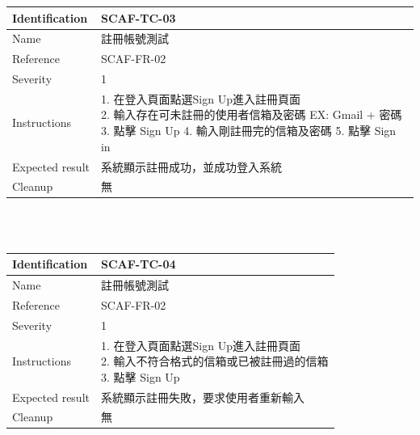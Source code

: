 \documentclass{report}
\begin{document}
\begin{tabularx}{\textwidth}{
  |p{}%
  |p{}|%
  }
  \hline
  \centering Identification &  SCAF-TC-03 \\
  \hline
  \centering Name & 註冊帳號測試 \\
  \hline
  \centering Reference & SCAF-FR-02 \\
  \hline
  \centering Severity & 1 \\
  \hline
  \centering Instructions & 
  \makecell[l]{
    1. 在登入頁面點選Sign Up進入註冊頁面 \\
    2. 輸入存在可未註冊的使用者信箱及密碼 EX: Gmail + 密碼 \\
    3. 點擊 Sign Up
    4. 輸入剛註冊完的信箱及密碼
    5. 點擊 Sign in
  }\\
  \hline
  \centering Expected result & 系統顯示註冊成功，並成功登入系統 \\
  \hline
  \centering Cleanup & 無 \\
  \hline
\end{tabularx}
\\
\newline
\\
\begin{tabularx}{\textwidth}{
  |p{}%
  |p{}|%
  }
  \hline
  \centering Identification &  SCAF-TC-04 \\
  \hline
  \centering Name & 註冊帳號測試 \\
  \hline
  \centering Reference & SCAF-FR-02 \\
  \hline
  \centering Severity & 1 \\
  \hline
  \centering Instructions & 
  \makecell[l]{
    1. 在登入頁面點選Sign Up進入註冊頁面 \\
    2. 輸入不符合格式的信箱或已被註冊過的信箱  \\
    3. 點擊 Sign Up
  }\\
  \hline
  \centering Expected result & 系統顯示註冊失敗，要求使用者重新輸入 \\
  \hline
  \centering Cleanup & 無 \\
  \hline
\end{tabularx}
\\
\newline
\\
\end{document}
